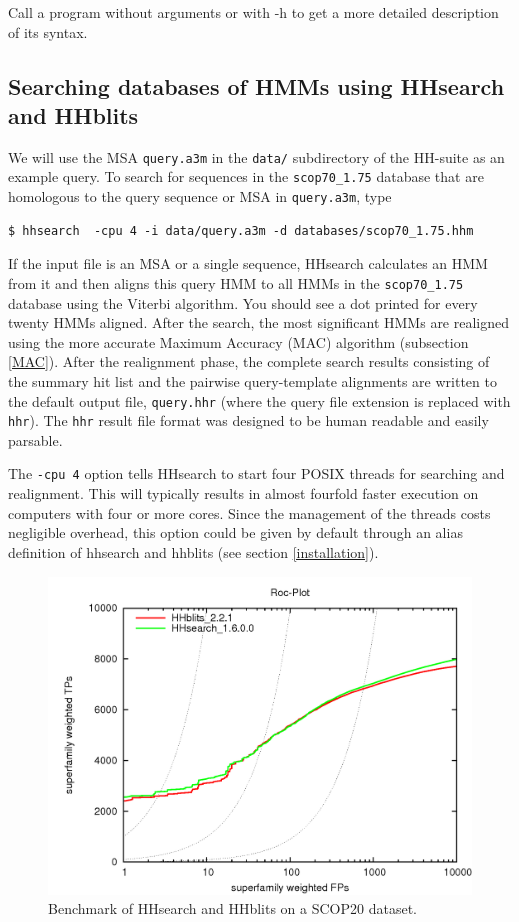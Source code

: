 \documentclass[11pt,a4paper]{article}
\begin{document}
Call a program without arguments or with -h to get a more detailed description of 
its syntax.


\subsection{Searching databases of HMMs using HHsearch and HHblits}\label{searching_hm_dbs}

We will use the MSA \verb`query.a3m` in the \verb`data/` subdirectory of the HH-suite as an example query. To search for sequences in the \verb`scop70_1.75` database that are homologous to the query sequence or MSA in \verb`query.a3m`, type

\begin{verbatim}
$ hhsearch  -cpu 4 -i data/query.a3m -d databases/scop70_1.75.hhm
\end{verbatim}

If the input file is an MSA or a single sequence, HHsearch calculates an HMM from it
and then aligns this query HMM to all 
HMMs in the \verb`scop70_1.75` database using the Viterbi algorithm. 
You should see a dot printed for every twenty HMMs aligned. After the search, 
the most significant HMMs are realigned using the more accurate Maximum Accuracy (MAC) 
algorithm (subsection \ref{MAC}). After the realignment phase, the complete search results consisting of the 
summary hit list and the pairwise query-template alignments are written to the default 
output file, \verb`query.hhr` (where the query file extension is replaced with \verb`hhr`). 
The \verb`hhr` result file format was designed to be human readable and easily parsable.

The \verb`-cpu 4` option tells HHsearch to start four POSIX threads for searching and realignment. This will typically results in almost fourfold faster execution on computers with four or more cores. Since the management of the threads costs negligible overhead, this option could be given by default through an alias definition of hhsearch and hhblits (see section \ref{installation}). 

\begin{figure}[h]
\begin{center}
\includegraphics[width=0.5 \textwidth]{hhblits-hhsearch.png}
\caption{Benchmark of HHsearch and HHblits on a SCOP20 dataset.}
\label{fig:hhsearch_hhblits_bench}
\end{center}
\end{figure}
\end{document}
